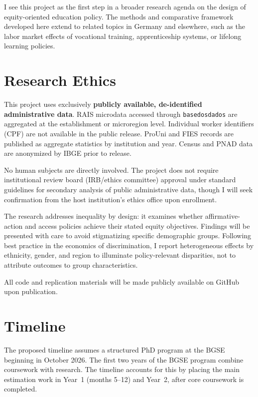\documentclass[a4paper,11pt]{article}
\begin{document}
I see this project as the first step in a broader research agenda on the design of equity-oriented education policy. The methods and comparative framework developed here extend to related topics in Germany and elsewhere, such as the labor market effects of vocational training, apprenticeship systems, or lifelong learning policies.

\section{Research Ethics}

This project uses exclusively \textbf{publicly available, de-identified administrative data}. RAIS microdata accessed through \texttt{basedosdados} are aggregated at the establishment or microregion level. Individual worker identifiers (CPF) are not available in the public release. ProUni and FIES records are published as aggregate statistics by institution and year. Census and PNAD data are anonymized by IBGE prior to release.

No human subjects are directly involved. The project does not require institutional review board (IRB/ethics committee) approval under standard guidelines for secondary analysis of public administrative data, though I will seek confirmation from the host institution's ethics office upon enrollment.

The research addresses inequality by design: it examines whether affirmative-action and access policies achieve their stated equity objectives. Findings will be presented with care to avoid stigmatizing specific demographic groups. Following best practice in the economics of discrimination, I report heterogeneous effects by ethnicity, gender, and region to illuminate policy-relevant disparities, not to attribute outcomes to group characteristics.

All code and replication materials will be made publicly available on GitHub upon publication.

\section{Timeline}

The proposed timeline assumes a structured PhD program at the BGSE beginning in October 2026. The first two years of the BGSE program combine coursework with research. The timeline accounts for this by placing the main estimation work in Year~1 (months 5--12) and Year~2, after core coursework is completed.
\end{document}
